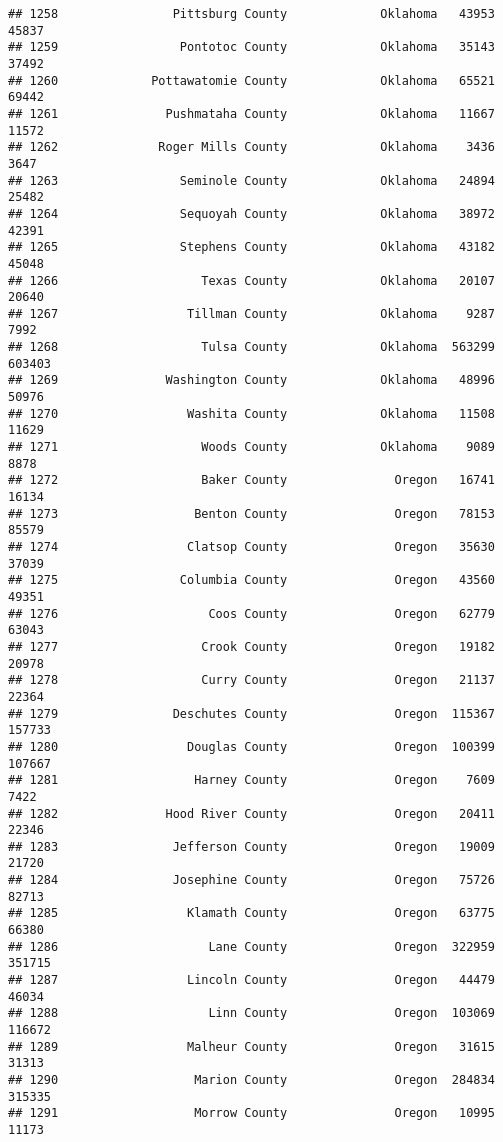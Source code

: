 \documentclass[
]{article}
\begin{document}
\begin{verbatim}
## 1258                Pittsburg County             Oklahoma   43953   45837
## 1259                 Pontotoc County             Oklahoma   35143   37492
## 1260             Pottawatomie County             Oklahoma   65521   69442
## 1261               Pushmataha County             Oklahoma   11667   11572
## 1262              Roger Mills County             Oklahoma    3436    3647
## 1263                 Seminole County             Oklahoma   24894   25482
## 1264                 Sequoyah County             Oklahoma   38972   42391
## 1265                 Stephens County             Oklahoma   43182   45048
## 1266                    Texas County             Oklahoma   20107   20640
## 1267                  Tillman County             Oklahoma    9287    7992
## 1268                    Tulsa County             Oklahoma  563299  603403
## 1269               Washington County             Oklahoma   48996   50976
## 1270                  Washita County             Oklahoma   11508   11629
## 1271                    Woods County             Oklahoma    9089    8878
## 1272                    Baker County               Oregon   16741   16134
## 1273                   Benton County               Oregon   78153   85579
## 1274                  Clatsop County               Oregon   35630   37039
## 1275                 Columbia County               Oregon   43560   49351
## 1276                     Coos County               Oregon   62779   63043
## 1277                    Crook County               Oregon   19182   20978
## 1278                    Curry County               Oregon   21137   22364
## 1279                Deschutes County               Oregon  115367  157733
## 1280                  Douglas County               Oregon  100399  107667
## 1281                   Harney County               Oregon    7609    7422
## 1282               Hood River County               Oregon   20411   22346
## 1283                Jefferson County               Oregon   19009   21720
## 1284                Josephine County               Oregon   75726   82713
## 1285                  Klamath County               Oregon   63775   66380
## 1286                     Lane County               Oregon  322959  351715
## 1287                  Lincoln County               Oregon   44479   46034
## 1288                     Linn County               Oregon  103069  116672
## 1289                  Malheur County               Oregon   31615   31313
## 1290                   Marion County               Oregon  284834  315335
## 1291                   Morrow County               Oregon   10995   11173

\end{verbatim}
\end{document}
